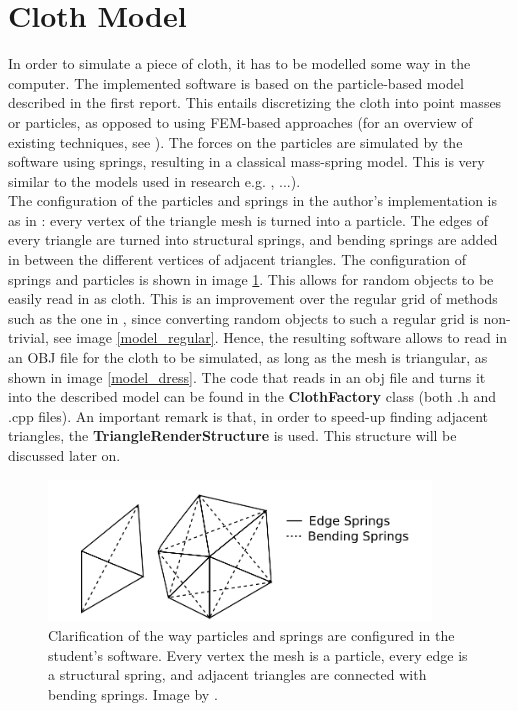 \ifx\isEmbedded\undefined

\graphicspath{{../img/}}

\tableofcontents
\pagebreak

\fi

\section{Cloth Model}\label{sec_model}
In order to simulate a piece of cloth, it has to be modelled some way in the computer. The implemented software is based on the particle-based model described in the first report. This entails discretizing the cloth into point masses or particles, as opposed to using FEM-based approaches (for an overview of existing techniques, see \citep{star_magn}). The forces on the particles are simulated by the software using springs, resulting in a classical mass-spring model. This is very similar to the models used in research e.g. \citep{provot_model, bridson_2002, choiko, position_based_dyn}, ...).\\

The configuration of the particles and springs in the author's implementation is as in \citep{robust_friction_2007}: every vertex of the triangle mesh is turned into a particle. The edges of every triangle are turned into structural springs, and bending springs are added in between the different vertices of adjacent triangles. The configuration of springs and particles is shown in image \ref{model_spring}. This allows for random objects to be easily read in as cloth. This is an improvement over the regular grid of methods such as the one in \cite{provot_model}, since converting random objects to such a regular grid is non-trivial, see image \ref{model_regular}. Hence, the resulting software allows to read in an OBJ file for the cloth to be simulated, as long as the mesh is triangular, as shown in image \ref{model_dress}. The code that reads in an obj file and turns it into the described model can be found in the {\bf ClothFactory} class (both .h and .cpp files). An important remark is that, in order to speed-up finding adjacent triangles, the {\bf TriangleRenderStructure} is used. This structure will be discussed later on.\\

\begin{figure}[!htb]
  \centering
  \includegraphics[width=4in,natwidth=366,natheight=166]{img/springConfig.png}
  \caption
   {Clarification of the way particles and springs are configured in the student's software. Every vertex the mesh is a particle, every edge is a structural spring, and adjacent triangles are connected with bending springs. Image by \cite{robust_friction_2007}.}
 \label{model_spring}
\end{figure}

